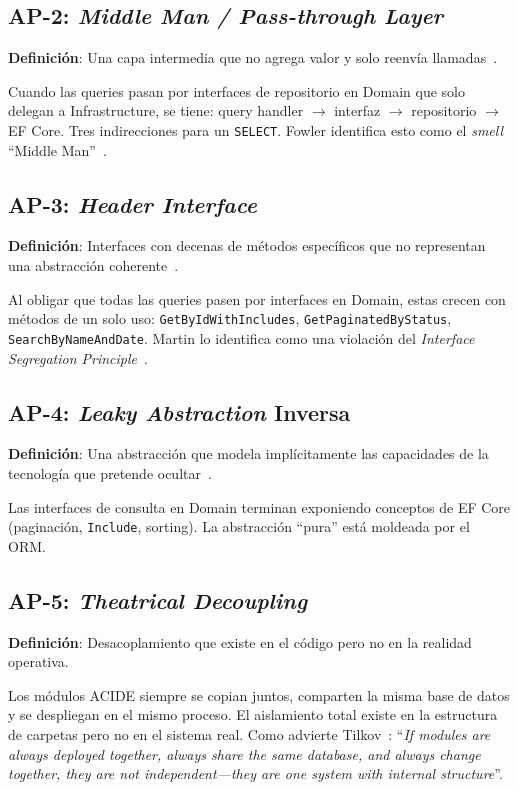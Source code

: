 \documentclass[conference]{IEEEtran}
\begin{document}
\subsection{AP-2: \textit{Middle Man / Pass-through Layer}}
\textbf{Definici\'on}: Una capa intermedia que no agrega valor y solo reenv\'ia llamadas~\cite{fowler1999}.

Cuando las queries pasan por interfaces de repositorio en Domain que solo delegan a Infrastructure, se tiene: query handler $\to$ interfaz $\to$ repositorio $\to$ EF Core. Tres indirecciones para un \texttt{SELECT}. Fowler identifica esto como el \textit{smell} ``Middle Man''~\cite{fowler1999}.

\subsection{AP-3: \textit{Header Interface}}
\textbf{Definici\'on}: Interfaces con decenas de m\'etodos espec\'ificos que no representan una abstracci\'on coherente~\cite{fowler2002}.

Al obligar que todas las queries pasen por interfaces en Domain, estas crecen con m\'etodos de un solo uso: \texttt{GetByIdWithIncludes}, \texttt{GetPaginatedByStatus}, \texttt{SearchByNameAndDate}. Martin lo identifica como una violaci\'on del \textit{Interface Segregation Principle}~\cite{martin2003}.

\subsection{AP-4: \textit{Leaky Abstraction} Inversa}
\textbf{Definici\'on}: Una abstracci\'on que modela impl\'icitamente las capacidades de la tecnolog\'ia que pretende ocultar~\cite{spolsky2002}.

Las interfaces de consulta en Domain terminan exponiendo conceptos de EF Core (paginaci\'on, \texttt{Include}, sorting). La abstracci\'on ``pura'' est\'a moldeada por el ORM.

\subsection{AP-5: \textit{Theatrical Decoupling}}
\textbf{Definici\'on}: Desacoplamiento que existe en el c\'odigo pero no en la realidad operativa.

Los m\'odulos ACIDE siempre se copian juntos, comparten la misma base de datos y se despliegan en el mismo proceso. El aislamiento total existe en la estructura de carpetas pero no en el sistema real. Como advierte Tilkov~\cite{tilkov2015}: ``\textit{If modules are always deployed together, always share the same database, and always change together, they are not independent---they are one system with internal structure}''.
\end{document}
